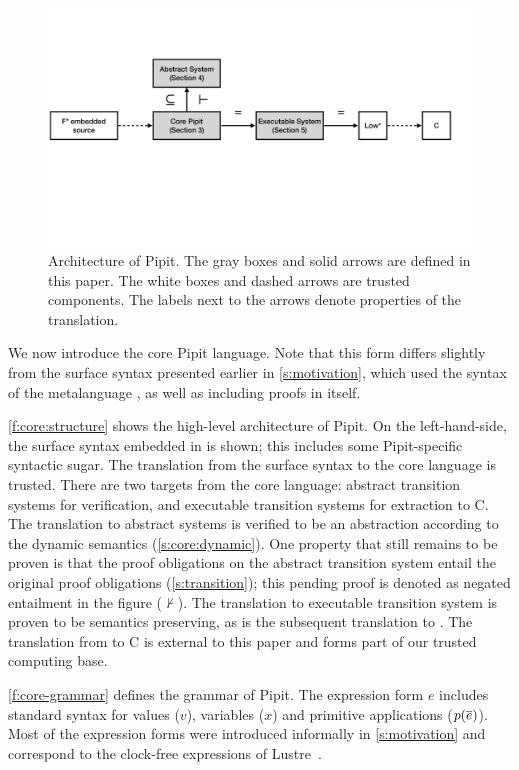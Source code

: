 \documentclass[a4paper,UKenglish,cleveref, autoref, thm-restate,anonymous]{lipics-v2021}
\begin{document}
\begin{figure}
  \includegraphics[width=\textwidth]{figures/core-structure.pdf}
\caption{Architecture of Pipit. The gray boxes and solid arrows are defined in this paper. The white boxes and dashed arrows are trusted components. The labels next to the arrows denote properties of the translation.
}
\label{f:core:structure}
\end{figure}
 
We now introduce the core Pipit language.
Note that this form differs slightly from the surface syntax presented earlier in \autoref{s:motivation}, which used the syntax of the metalanguage \fstar{}, as well as including proofs in \fstar{} itself.


\autoref{f:core:structure} shows the high-level architecture of Pipit.
On the left-hand-side, the surface syntax embedded in \fstar{} is shown; this includes some Pipit-specific syntactic sugar.
The translation from the surface syntax to the core language is trusted.
There are two targets from the core language: abstract transition systems for verification, and executable transition systems for extraction to C.
The translation to abstract systems is verified to be an abstraction according to the dynamic semantics (\autoref{s:core:dynamic}).
One property that still remains to be proven is that the proof obligations on the abstract transition system entail the original proof obligations (\autoref{s:transition}); this pending proof is denoted as negated entailment in the figure ($\not\vdash$).
The translation to executable transition system is proven to be semantics preserving, as is the subsequent translation to \lowstar{}.
The translation from \lowstar{} to C is external to this paper and forms part of our trusted computing base.


\autoref{f:core-grammar} defines the grammar of Pipit.
The expression form $e$ includes standard syntax for values ($v$), variables ($x$) and primitive applications ($p(\overline{e})$).
Most of the expression forms were introduced informally in \autoref{s:motivation} and correspond to the clock-free expressions of Lustre~\cite{caspi1995functional}.
\end{document}
